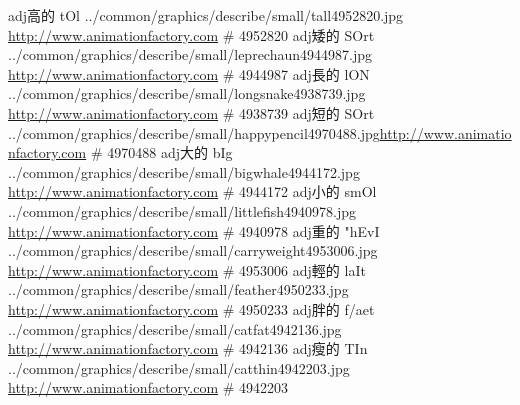\begin{tGegzkD}{5}{}
    {adj}{高的}  {}{tOl}    {../common/graphics/describe/small/tall4952820.jpg       }{\url{http://www.animationfactory.com} \;\# 4952820}  
   {adj}{矮的}  {}{SOrt}   {../common/graphics/describe/small/leprechaun4944987.jpg }{\url{http://www.animationfactory.com} \;\# 4944987}  
    {adj}{長的}  {}{lON}    {../common/graphics/describe/small/longsnake4938739.jpg}  {\url{http://www.animationfactory.com} \;\# 4938739}  
   {adj}{短的}  {}{SOrt}   {../common/graphics/describe/small/happypencil4970488.jpg}{\url{http://www.animationfactory.com} \;\# 4970488}  
     {adj}{大的}  {}{bIg}    {../common/graphics/describe/small/bigwhale4944172.jpg}   {\url{http://www.animationfactory.com} \;\# 4944172}  
   {adj}{小的}  {}{smOl}   {../common/graphics/describe/small/littlefish4940978.jpg} {\url{http://www.animationfactory.com} \;\# 4940978}  
   {adj}{重的}  {}{"hEvI}   {../common/graphics/describe/small/carryweight4953006.jpg} {\url{http://www.animationfactory.com} \;\# 4953006}  
   {adj}{輕的}  {}{laIt}    {../common/graphics/describe/small/feather4950233.jpg} {\url{http://www.animationfactory.com} \;\# 4950233}  
     {adj}{胖的}  {}{f{/ae}t} {../common/graphics/describe/small/catfat4942136.jpg     }{\url{http://www.animationfactory.com} \;\# 4942136}  
    {adj}{瘦的}  {}{TIn}    {../common/graphics/describe/small/catthin4942203.jpg    }{\url{http://www.animationfactory.com} \;\# 4942203}  
\end{tGegzkD}

